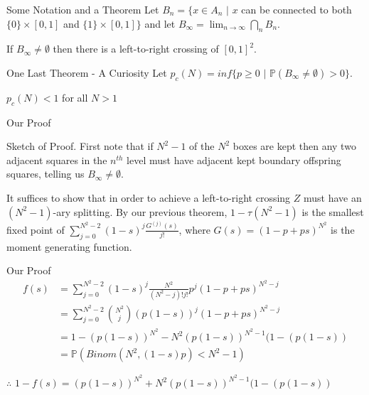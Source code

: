 \documentclass{beamer}
\begin{document}
\begin{frame}{Some Notation and a Theorem}
Let $B_n = \{x \in A_n$ $|$ $x$ can be connected to both $\{0\} \times [0,1]$ and $\{1\} \times [0,1]\}$ and let $B_{\infty} = \lim_{n \to \infty} \bigcap_n B_n$.

\pause
\vspace{10 mm}
If $B_{\infty} \ne \emptyset$ then there is a left-to-right crossing of $[0,1]^2$.
\end{frame}

\begin{frame}{One Last Theorem - A Curiosity}
Let $p_c(N) = inf\{p \ge 0$ $|$ $\mathbb{P}(B_{\infty} \ne \emptyset) > 0\}$.

\vspace{10 mm}
\pause
\begin{theorem}
$p_c(N) < 1$ for all $N > 1$
\end{theorem}
\end{frame}

\begin{frame}{Our Proof}
\begin{block}{Sketch of Proof.}
First note that if $N^2 - 1$ of the $N^2$ boxes are kept then any two adjacent squares in the $n^{th}$ level must have adjacent kept boundary offspring squares, telling us $B_{\infty} \ne \emptyset$.

\vspace{10 mm}
\pause
It suffices to show that in order to achieve a left-to-right crossing $Z$ must have an $(N^2 - 1)$-ary splitting. By our previous theorem, $1 - \tau(N^2 - 1)$ is the smallest fixed point of $\sum_{j=0}^{N^2 - 2} (1-s)^j \frac{G^{(j)}(s)}{j!}$, where $G(s) = (1 - p + ps)^{N^2}$ is the moment generating function. 
\end{block}
\end{frame}

\begin{frame}{Our Proof}
\begin{align*}
f(s) &= \sum_{j=0}^{N^2 - 2} (1 - s)^j \frac{N^2}{(N^2 - j)!j!}p^j(1 - p + ps)^{N^2 - j} \\
& = \sum_{j=0}^{N^2 - 2} {N^2 \choose j} (p(1 - s))^j(1 - p + ps)^{N^2 - j} \\
&= 1 - (p(1 - s))^{N^2} - N^2(p(1 - s))^{N^2 - 1}(1 - (p(1 - s)) \\
&= \mathbb{P}(Binom(N^2, (1 - s)p) < N^2 - 1)
\end{align*}

\vspace{10 mm}
\pause
$\therefore$ $1 - f(s) = (p(1 - s))^{N^2} + N^2(p(1 - s))^{N^2 - 1}(1 - (p(1 - s))$
\end{frame}
\end{document}
